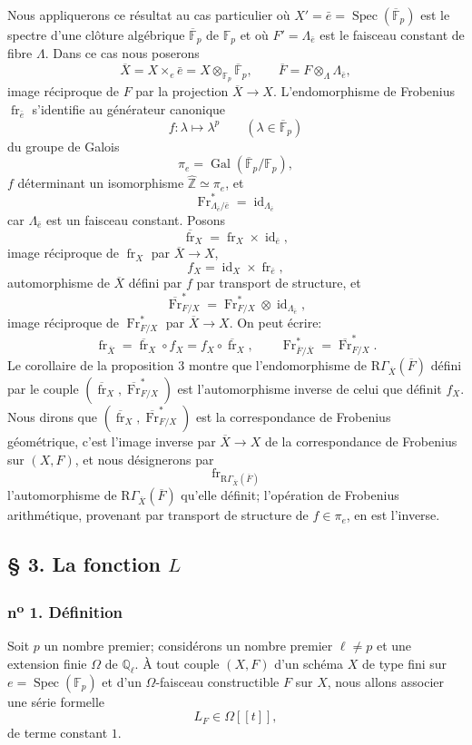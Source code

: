 \documentclass[11pt]{article}
\DeclareMathOperator{\Spec}{Spec}
\providecommand{\Gal}{\operatorname{Gal}}
\providecommand{\RGamma}{\mathrm R\Gamma}
\providecommand{\id}{\operatorname{id}}
\providecommand{\id}{\operatorname{id}}
\providecommand{\id}{\operatorname{id}}
\providecommand{\RGamma}{\mathrm R\Gamma}
\providecommand{\id}{\operatorname{id}}
\providecommand{\Spec}{\operatorname{Spec}}
\providecommand{\Spec}{\operatorname{Spec}}
\providecommand{\id}{\operatorname{id}}
\providecommand{\Spec}{\operatorname{Spec}}
\providecommand{\fr}{\operatorname{fr}}
\providecommand{\Fr}{\operatorname{Fr}}
\providecommand{\Fr}{\operatorname{Fr}}
\providecommand{\fr}{\operatorname{fr}}
\providecommand{\Spec}{\operatorname{Spec}}
\providecommand{\id}{\operatorname{id}}
\providecommand{\RGamma}{\mathrm R\Gamma}
\providecommand{\Gal}{\operatorname{Gal}}
\begin{document}
Nous appliquerons ce résultat au cas particulier où $X'=\bar e=\Spec(\overline{\mathbb F}_p)$ est le spectre d'une clôture algébrique $\overline{\mathbb F}_p$ de $\mathbb F_p$ et où $F'=\Lambda_{\bar e}$ est le faisceau constant de fibre $\Lambda$. Dans ce cas nous poserons
\[
\overline X=X\times_e\bar e=X\otimes_{\mathbb F_p}\overline{\mathbb F}_p,
\qquad
\overline F=F\otimes_\Lambda\Lambda_{\bar e},
\]
image réciproque de $F$ par la projection $\overline X\to X$. L'endomorphisme de Frobenius $\fr_{\bar e}$ s'identifie au générateur canonique
\[
f:\lambda\longmapsto\lambda^p\qquad(\lambda\in\overline{\mathbb F}_p)
\]
du groupe de Galois
\[
\pi_e=\Gal(\overline{\mathbb F}_p/\mathbb F_p),
\]
$f$ déterminant un isomorphisme $\widehat{\mathbb Z}\simeq\pi_e$, et
\[
\Fr^*_{\Lambda_{\bar e}/\bar e}=\id_{\Lambda_{\bar e}}
\]
car $\Lambda_{\bar e}$ est un faisceau constant. Posons
\[
\overline{\fr}_X=\fr_X\times\id_{\bar e},
\]
image réciproque de $\fr_X$ par $\overline X\to X$,
\[
f_X=\id_X\times\fr_{\bar e},
\]
automorphisme de $\overline X$ défini par $f$ par transport de structure, et
\[
\overline{\Fr}^*_{F/X}=\Fr^*_{F/X}\otimes\id_{\Lambda_{\bar e}},
\]
image réciproque de $\Fr^*_{F/X}$ par $\overline X\to X$. On peut écrire:
\[
\fr_{\overline X}=\overline{\fr}_X\circ f_X=f_X\circ\overline{\fr}_X,
\qquad
\Fr^*_{\overline F/\overline X}=\overline{\Fr}^*_{F/X}.
\]
Le corollaire de la proposition 3 montre que l'endomorphisme de $\RGamma_{\overline X}(\overline F)$ défini par le couple $(\overline{\fr}_X,\overline{\Fr}^*_{F/X})$ est l'automorphisme inverse de celui que définit $f_X$. Nous dirons que $(\overline{\fr}_X,\overline{\Fr}^*_{F/X})$ est la correspondance de Frobenius géométrique, c'est l'image inverse par $\overline X\to X$ de la correspondance de Frobenius sur $(X,F)$, et nous désignerons par
\[
\fr_{\RGamma_{\overline X}(\overline F)}
\]
l'automorphisme de $\RGamma_{\overline X}(\overline F)$ qu'elle définit; l'opération de Frobenius arithmétique, provenant par transport de structure de $f\in\pi_e$, en est l'inverse.

\subsection*{§ 3. La fonction $L$}

\subsubsection*{n\textsuperscript{o} 1. Définition}

Soit $p$ un nombre premier; considérons un nombre premier $\ell\ne p$ et une extension finie $\Omega$ de $\mathbb Q_\ell$. À tout couple $(X,F)$ d'un schéma $X$ de type fini sur $e=\Spec(\mathbb F_p)$ et d'un $\Omega$-faisceau constructible $F$ sur $X$, nous allons associer une série formelle
\[
L_F\in\Omega[[t]],
\]
de terme constant $1$.
\end{document}
